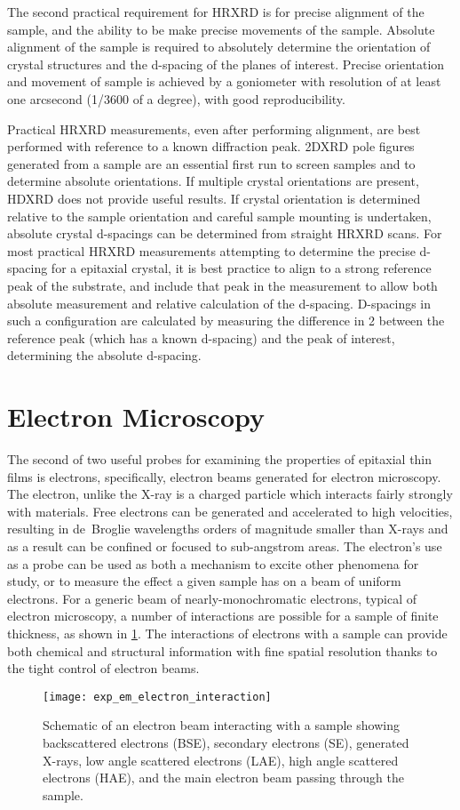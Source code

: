The second practical requirement for HRXRD is for precise alignment of the sample, and the ability to be make precise movements of the sample.
Absolute alignment of the sample is required to absolutely determine the orientation of crystal structures and the d-spacing of the planes of interest.
Precise orientation and movement of sample is achieved by a goniometer with resolution of at least one arcsecond (1/3600 of a degree), with good reproducibility.

Practical HRXRD measurements, even after performing alignment, are best performed with reference to a known diffraction peak.
2DXRD pole figures generated from a sample are an essential first run to screen samples and to determine absolute orientations.
If multiple crystal orientations are present, HDXRD does not provide useful results.
If crystal orientation is determined relative to the sample orientation and careful sample mounting is undertaken, absolute crystal d-spacings can be determined from straight HRXRD scans.
For most practical HRXRD measurements attempting to determine the precise d-spacing for a epitaxial crystal, it is best practice to align to a strong reference peak of the substrate, and include that peak in the measurement to allow both absolute measurement and relative calculation of the d-spacing.
D-spacings in such a configuration are calculated by measuring the difference in 2\straighttheta{} between the reference peak (which has a known d-spacing) and the peak of interest, determining the absolute d-spacing.

\section{Electron Microscopy}
The second of two useful probes for examining the properties of epitaxial thin films is electrons, specifically, electron beams generated for electron microscopy.
The electron, unlike the X-ray is a charged particle which interacts fairly strongly with materials.
Free electrons can be generated and accelerated to high velocities, resulting in de~Broglie wavelengths orders of magnitude smaller than X-rays and as a result can be confined or focused to sub-angstrom areas.
The electron's use as a probe can be used as both a mechanism to excite other phenomena for study, or to measure the effect a given sample has on a beam of uniform electrons.
For a generic beam of nearly-monochromatic electrons, typical of electron microscopy, a number of interactions are possible for a sample of finite thickness, as shown in \cref{fig:exp_em_electron_interaction}.
The interactions of electrons with a sample can provide both chemical and structural information with fine spatial resolution thanks to the tight control of electron beams.
\begin{figure}
 \centering \texttt{[image: exp\_em\_electron\_interaction]}
 \caption[Electron interactions with materials]{\label{fig:exp_em_electron_interaction}Schematic of an electron beam interacting with a sample showing backscattered electrons (BSE), secondary electrons (SE), generated X-rays, low angle scattered electrons (LAE), high angle scattered electrons (HAE), and the main electron beam passing through the sample.}
\end{figure}

